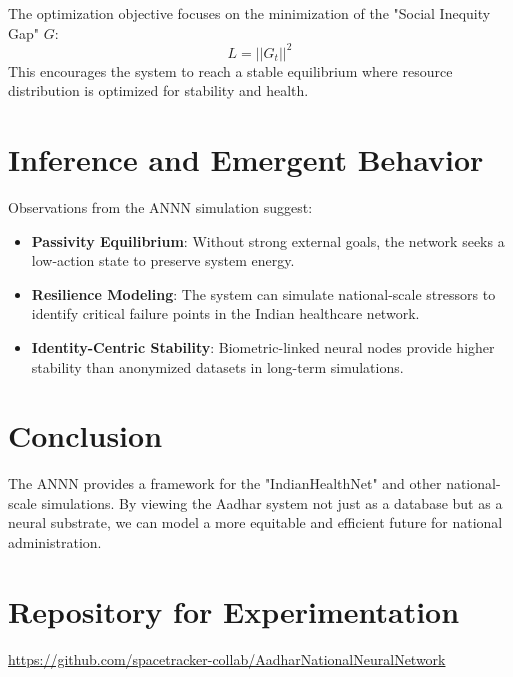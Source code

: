 \documentclass[12pt]{article}
\begin{document}
The optimization objective focuses on the minimization of the "Social Inequity Gap" $G$:
\[
L = ||G_t||^2
\]
This encourages the system to reach a stable equilibrium where resource distribution is optimized for stability and health.

\section{Inference and Emergent Behavior}

Observations from the ANNN simulation suggest:
\begin{itemize}
\item \textbf{Passivity Equilibrium}: Without strong external goals, the network seeks a low-action state to preserve system energy.
\item \textbf{Resilience Modeling}: The system can simulate national-scale stressors to identify critical failure points in the Indian healthcare network.
\item \textbf{Identity-Centric Stability}: Biometric-linked neural nodes provide higher stability than anonymized datasets in long-term simulations.
\end{itemize}

\section{Conclusion}
The ANNN provides a framework for the "IndianHealthNet" and other national-scale simulations. By viewing the Aadhar system not just as a database but as a neural substrate, we can model a more equitable and efficient future for national administration.

\section{Repository for Experimentation}
\noindent
\url{https://github.com/spacetracker-collab/AadharNationalNeuralNetwork}
\end{document}
